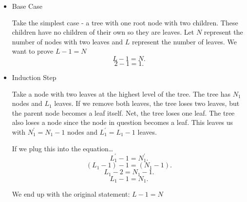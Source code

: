 \documentclass[letterpaper,11pt]{article}
\begin{document}
        \begin{itemize}
            \item Base Case

                Take the simplest case - a tree with one root node with two 
                children. These children have no children of their own so they 
                are leaves. Let $N$ represent the number of nodes with two leaves
                and $L$ represent the number of leaves. We want to prove $L - 1 = N$ 
                \[
                L - 1 = N
                .\] 
                \[
                2 - 1 = 1
                .\] 

            \item Induction Step
                
                Take a node with two leaves at the highest level of the tree.
                The tree has $N_1$ nodes and $L_1$ leaves. If we remove both leaves, 
                the tree loses two leaves, but the parent node becomes a leaf 
                itself. Net, the tree loses one leaf. The tree also loses a node
                since the node in question becomes a leaf. This leaves us with 
                $N_1^{\prime} = N_1 - 1$ nodes and $L^{\prime}_1 = L_1 - 1$ leaves.
                
                If we plug this into 
                the equation\ldots
                \[
                L^{\prime}_1 - 1 = N^{\prime}_1
                .\] 
                \[
                    \left( L_1 - 1 \right)  - 1 = \left( N_1 - 1 \right) 
                .\] 
                \[
                L_1 - 2 = N_1 - 1
                .\] 
                \[
                L_1 - 1 = N_1
                .\] 

                We end up with the original statement: $L - 1 = N$ 

        \end{itemize}
\end{document}
